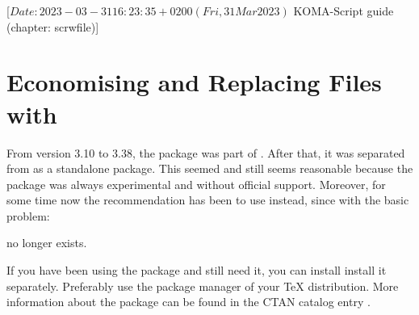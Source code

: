 %
%
%
%
%
%
%

%
                 [$Date: 2023-03-31 16:23:35 +0200 (Fri, 31 Mar 2023) $
                  KOMA-Script guide (chapter: scrwfile)]


\chapter{Economising and Replacing Files with }
\BeginIndexGroup
{}

From version 3.10 to 3.38, the package
\href{https://www.ctan.org/pkg/scrwfile}{} was part of
\KOMAScript. After that, it was separated from \KOMAScript{} as a standalone
package. This seemed and still seems reasonable because the package was always
experimental and without official support. Moreover, for some time now the
recommendation has been to use \LuaLaTeX{} instead, since with \LuaLaTeX{} the
basic problem:
no longer exists.

If you have been using the package and still need it, you can install install
it separately. Preferably use the package manager of your \TeX{}
distribution. More information about the package can be found in the CTAN
catalog entry \cite{package:scrwfile}.%
\EndIndexGroup

